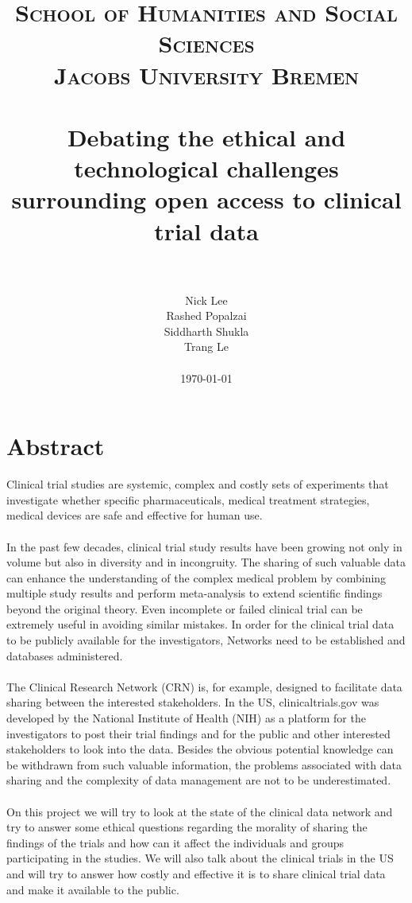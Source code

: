 \documentclass[paper=a4, fontsize=12pt]{article}
\title{
		\vspace{-1in} 	
		\usefont{OT1}{bch}{b}{n}
		\normalfont \normalsize \textsc{School of Humanities and Social Sciences\\Jacobs University Bremen} \\ [25pt]
		\horrule{0.5pt} \\[0.4cm]
		\huge Debating the ethical and technological challenges surrounding open access to clinical trial data\\
		\horrule{2pt} \\[0.5cm]
}
\author{Nick Lee\\Rashed Popalzai\\Siddharth Shukla\\Trang Le\\\\\today}
\date{}
\begin{document}
\maketitle
\newpage
{}

\section*{Abstract}
Clinical trial studies are systemic, complex and costly sets of experiments that investigate whether specific pharmaceuticals, medical treatment strategies, medical devices are safe and effective for human use.\\\\
In the past few decades, clinical trial study results have been growing not only in volume but also in diversity and in incongruity. The sharing of such valuable data can enhance the understanding of the complex medical problem by combining multiple study results and perform meta-analysis to extend scientific findings beyond the original theory. Even incomplete or failed clinical trial can be extremely useful in avoiding similar mistakes. In order for the clinical trial data to be publicly available for the investigators, Networks need to be established and databases administered.\\\\
The Clinical Research Network (CRN) is, for example, designed to facilitate data sharing between the interested stakeholders. In the US, clinicaltrials.gov was developed by the  National Institute of Health (NIH) as a platform for the investigators to post their trial findings and for the public and other interested stakeholders to look into the data. Besides the obvious potential knowledge can be withdrawn from such valuable information, the problems associated with data sharing and the complexity of data management are not to be underestimated.\\\\
On this project we will try to look at the state of the clinical data network and try to answer some ethical questions regarding the morality of sharing the findings of the trials and how can it affect the individuals and groups participating in the studies. We will also talk about the clinical trials in the US and will try to answer how costly and effective it is to share clinical trial data and make it available to the public.
\end{document}
